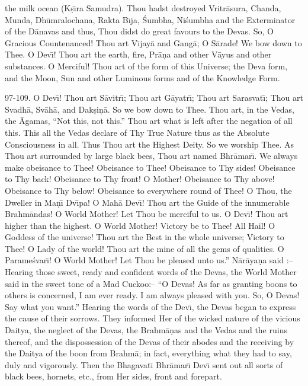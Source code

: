 the milk ocean (K\d{s}\={\i}ra Samudra). Thou hadst destroyed Vritr\=asura, Chanda, Munda, Dh\=umralochana, Rakta B\={\i}ja, \'Sumbha, Ni\'sumbha and the Exterminator of the D\=anavas and thus, Thou didst do great favours to the Devas. So, O Gracious Countenanced! Thou art V\={\i}jay\=a and Gang\=a; O S\=arade! We bow down to Thee. O Dev\={\i}! Thou art the earth, fire, Pr\=a\d{n}a and other V\=ayus and other substances. O Merciful! Thou art of the form of this Universe; the Deva form, and the Moon, Sun and other Luminous forms and of the Knowledge Form.

97-109. O Dev\={\i}! Thou art S\=avitr\={\i}; Thou art G\=ayatr\={\i}; Thou art Sarasvat\={\i}; Thou art Svadh\=a, Sv\=ah\=a, and Dak\d{s}i\d{n}\=a. So we bow down to Thee. Thou art, in the Vedas, the \=Agamas, ``Not this, not this.'' Thou art what is left after the negation of all this. This all the Vedas declare of Thy True Nature thus as the Absolute Consciousness in all. Thus Thou art the Highest Deity. So we worship Thee. As Thou art surrounded by large black bees, Thou art named Bhr\=amar\={\i}. We always make obeisance to Thee! Obeisance to Thee! Obeisance to Thy sides! Obeisance to Thy back! Obeisance to Thy front! O Mother! Obeisance to Thy above! Obeisance to Thy below! Obeisance to everywhere round of Thee! O Thou, the Dweller in Ma\d{n}\={\i} Dv\={\i}pa! O Mah\=a Dev\={\i}! Thou art the Guide of the innumerable Brahm\=andas! O World Mother! Let Thou be merciful to us. O Dev\={\i}! Thou art higher than the highest. O World Mother! Victory be to Thee! All Hail! O Goddess of the universe! Thou art the Best in the whole universe; Victory to Thee! O Lady of the world! Thou art the mine of all the gems of qualities. O Parame\'svar\={\i}! O World Mother! Let Thou be pleased unto us.'' N\=ar\=aya\d{n}a said :-- Hearing those sweet, ready and confident words of the Devas, the World Mother said in the sweet tone of a Mad Cuckoo:-- ``O Devas! As far as granting boons to others is concerned, I am ever ready. I am always pleased with you. So, O Devas! Say what you want.'' Hearing the words of the Dev\={\i}, the Devas began to express the cause of their sorrows. They informed Her of the wicked nature of the vicious Daitya, the neglect of the Devas, the Brahm\=a\d{n}as and the Vedas and the ruins thereof, and the dispossession of the Devas of their abodes and the receiving by the Daitya of the boon from Brahm\=a; in fact, everything what they had to say, duly and vigorously. Then the Bhagavat\={\i} Bhr\=amar\={\i} Dev\={\i} sent out all sorts of black bees, hornets, etc., from Her sides, front and forepart.


